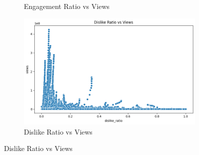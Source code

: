 \documentclass[a4paper]{article}
\begin{document}
\begin{figure}[h]
\begin{subfigure}{0.3\textwidth}
        \caption{Engagement Ratio vs Views}
        \label{fig:sub5}
    \end{subfigure}
    \hfill
    \begin{subfigure}{0.3\textwidth}
        \includegraphics[width=\linewidth]{other8.png}
        \caption{Dislike Ratio vs Views}
        \label{fig:sub5}
    \end{subfigure}
    \label{fig:multi}
\end{figure}
\end{document}
